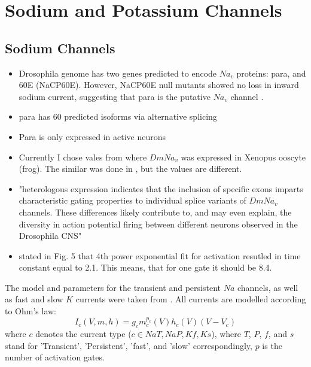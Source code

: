 \documentclass[../../workflow.tex]{subfiles}
\begin{document}
\section{Sodium and Potassium Channels}

\subsection{Sodium Channels}

\begin{itemize}
    \item Drosophila genome has two genes predicted to encode $Na_v$ proteins: para, and
    60E (NaCP60E). However, NaCP60E null mutants showed no loss in inward sodium current,
    suggesting that para is the putative $Na_v$ channel \cite{ravenscroftDrosophilaVoltageGatedSodium2020}.
    \item para has 60 predicted isoforms via alternative splicing \cite{ravenscroftDrosophilaVoltageGatedSodium2020}
    \item Para is only expressed in active neurons \cite{ravenscroftDrosophilaVoltageGatedSodium2020}
    \item Currently I chose vales from \cite{warmkeFunctionalExpressionDrosophila1997} where
    $DmNa_v$ was expressed in Xenopus ooscyte (frog). The similar was done in
    \cite{linAlternativeSplicingVoltageGated2009}, but the values are different.
    \item "heterologous expression indicates that the inclusion of specific exons imparts
    characteristic gating properties to individual splice variants of $DmNa_v$ channels.
    These differences likely contribute to, and may even explain, the diversity in action
    potential firing between different neurons observed in the Drosophila CNS"
    \item \cite{ravenscroftDrosophilaVoltageGatedSodium2020} stated in Fig. 5 that
    4th power exponential fit for activation resutled in time constant equal to 2.1.
    This means, that for one gate it should be 8.4.
\end{itemize}


The model and parameters for the transient and persistent $Na$ channels,
as well as fast and slow $K$ currents were taken from
\cite{gunayDistalSpikeInitiation2015}. All currents are modelled according to Ohm's law:
\begin{equation*}
    I_{c}(V,m,h) = g_{c} m_{c}^{p_c}(V) h_{c}(V) (V - V_{c})
\end{equation*}
where $c$ denotes the current type ($c \in {NaT,NaP,Kf,Ks}$), where $T$, $P$, $f$, and $s$
stand for 'Transient', 'Persistent', 'fast', and 'slow' correspondingly, $p$ is the number of activation gates.
\end{document}
